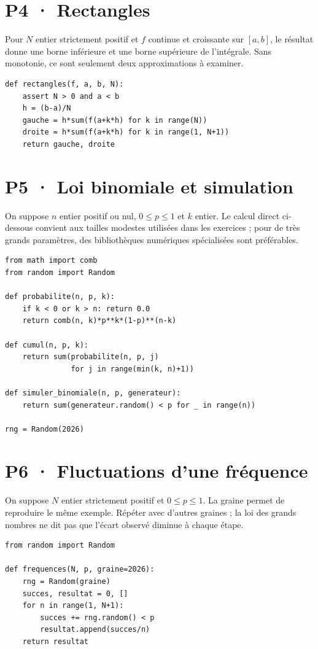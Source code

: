 \section{P4 · Rectangles}
Pour $N$ entier strictement positif et $f$ continue et croissante sur $[a,b]$, le résultat donne une borne inférieure et une borne supérieure de l'intégrale. Sans monotonie, ce sont seulement deux approximations à examiner.
\begin{lstlisting}
def rectangles(f, a, b, N):
    assert N > 0 and a < b
    h = (b-a)/N
    gauche = h*sum(f(a+k*h) for k in range(N))
    droite = h*sum(f(a+k*h) for k in range(1, N+1))
    return gauche, droite
\end{lstlisting}
\mxnewpage\section{P5 · Loi binomiale et simulation}
On suppose $n$ entier positif ou nul, $0\le p\le1$ et $k$ entier. Le calcul direct ci-dessous convient aux tailles modestes utilisées dans les exercices ; pour de très grands paramètres, des bibliothèques numériques spécialisées sont préférables.
\begin{lstlisting}
from math import comb
from random import Random

def probabilite(n, p, k):
    if k < 0 or k > n: return 0.0
    return comb(n, k)*p**k*(1-p)**(n-k)

def cumul(n, p, k):
    return sum(probabilite(n, p, j)
               for j in range(min(k, n)+1))

def simuler_binomiale(n, p, generateur):
    return sum(generateur.random() < p for _ in range(n))

rng = Random(2026)
\end{lstlisting}
\section{P6 · Fluctuations d'une fréquence}
On suppose $N$ entier strictement positif et $0\le p\le1$. La graine permet de reproduire le même exemple. Répéter avec d'autres graines ; la loi des grands nombres ne dit pas que l'écart observé diminue à chaque étape.
\begin{lstlisting}
from random import Random

def frequences(N, p, graine=2026):
    rng = Random(graine)
    succes, resultat = 0, []
    for n in range(1, N+1):
        succes += rng.random() < p
        resultat.append(succes/n)
    return resultat
\end{lstlisting}
